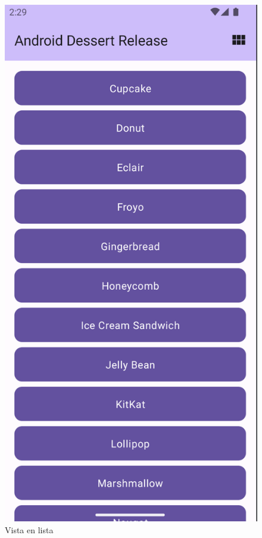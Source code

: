 \documentclass{article}
\begin{document}
        \begin{figure}[H]
            \centerline{\includegraphics[scale=0.3]{codelab2.1_1.png}}
            \caption{Vista en lista}
            \label{fig:codelab2.1_1}
        \end{figure}
\end{document}
